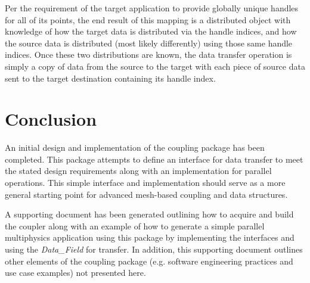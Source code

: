 \documentclass[letterpaper]{article}
\begin{document}
Per the requirement of the target application to provide globally
unique handles for all of its points, the end result of this mapping
is a distributed object with knowledge of how the target data is
distributed via the handle indices, and how the source
data is distributed (most likely differently) using those same handle
indices. Once these two distributions are known, the data transfer
operation is simply a copy of data from the source to the target with
each piece of source data sent to the target destination containing
its handle index. 

\section{Conclusion}
An initial design and implementation of the coupling package has been
completed. This package attempts to define an interface for data
transfer to meet the stated design requirements along with an
implementation for parallel operations. This simple interface and
implementation should serve as a more general starting point for
advanced mesh-based coupling and data structures.

A supporting document has been generated outlining how to acquire and
build the coupler along with an example of how to generate a simple
parallel multiphysics application using this package by implementing
the interfaces and using the {\sl Data\_Field} for transfer. In
addition, this supporting document outlines other elements of the
coupling package (e.g. software engineering practices and use case
examples) not presented here.

\pagebreak


\end{document}
